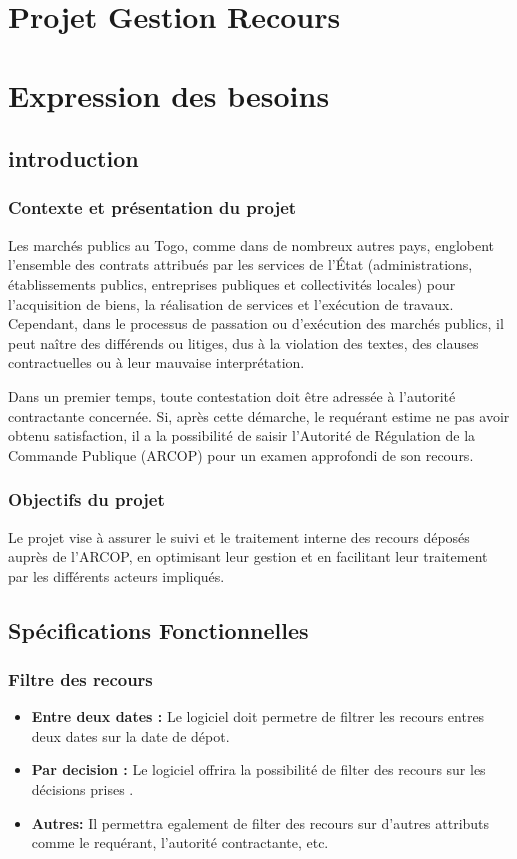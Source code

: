 \chapter{Projet Gestion Recours}
\chapter{Expression des besoins}
\clearpage
\section{introduction}

\subsection{Contexte et présentation du projet}
Les marchés publics au Togo, comme dans de nombreux autres pays, englobent l'ensemble des contrats attribués par les services de l'État (administrations, établissements publics, entreprises publiques et collectivités locales) pour l'acquisition de biens, la réalisation de services et l'exécution de travaux. Cependant, dans le processus de passation ou d’exécution des marchés publics, il peut naître des différends ou litiges, dus à la violation des textes, des clauses contractuelles ou à leur mauvaise interprétation.

Dans un premier temps, toute contestation doit être adressée à l'autorité contractante concernée. Si, après cette démarche, le requérant estime ne pas avoir obtenu satisfaction, il a la possibilité de saisir l'Autorité de Régulation de la Commande Publique (ARCOP) pour un examen approfondi de son recours.

\subsection{Objectifs du projet}
Le projet vise à assurer le suivi et le traitement interne des recours déposés auprès de l'ARCOP, en optimisant leur gestion et en facilitant leur traitement par les différents acteurs impliqués.

\section{Spécifications Fonctionnelles}


\subsection{Filtre des recours}
\begin{itemize}
    \item \textbf{Entre deux dates :} Le logiciel doit permetre de filtrer les recours entres deux dates sur la date de dépot.

    \item \textbf{Par decision :} Le logiciel offrira la possibilité de filter des recours sur les décisions prises .
    \item \textbf{Autres:} Il permettra egalement de filter des recours sur d'autres attributs comme le requérant, l'autorité contractante, etc.

\end{itemize}

